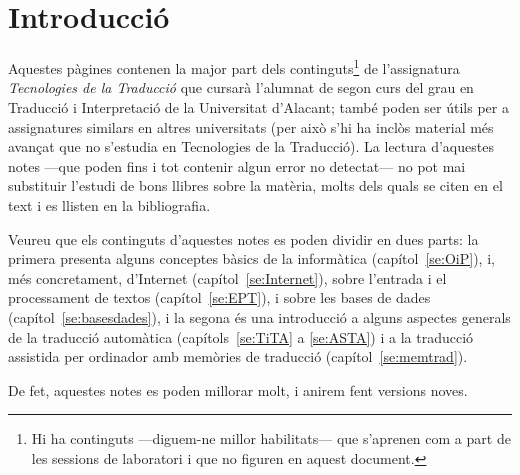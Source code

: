 \chapter{Introducció}


Aquestes pàgines contenen la major part dels continguts\footnote{Hi ha
  continguts ---diguem-ne millor habilitats--- que s'aprenen com a
  part de les sessions de laboratori i que no figuren en aquest
  document.} de l'assignatura \emph{Tecnologies de la Traducció} que
cursarà l'alumnat de segon curs del grau en Traducció i Interpretació
de la Universitat d'Alacant; també poden ser útils per a assignatures
similars en altres universitats (per això s'hi ha inclòs material més
avançat que no s'estudia en Tecnologies de la Traducció).  La lectura
d'aquestes notes ---que poden fins i tot contenir algun error no
detectat--- no pot mai substituir l'estudi de bons llibres sobre la
matèria, molts dels quals se citen en el text i es llisten en la
bibliografia.
  
Veureu que els continguts d'aquestes notes es poden dividir en dues
parts: la primera presenta alguns conceptes bàsics de la informàtica
(capítol~\ref{se:OiP}), i, més concretament, d'Internet
(capítol~\ref{se:Internet}), sobre l'entrada i el processament de
textos (capítol~\ref{se:EPT}), i sobre les bases de dades
(capítol~\ref{se:basesdades}), i la segona és una introducció a alguns
aspectes generals de la traducció automàtica (capítols~\ref{se:TiTA} a
\ref{se:ASTA}) i a la traducció assistida per ordinador amb memòries
de traducció (capítol~\ref{se:memtrad}).
  
  De fet, aquestes notes es poden millorar molt, i anirem fent
  versions noves.
  
